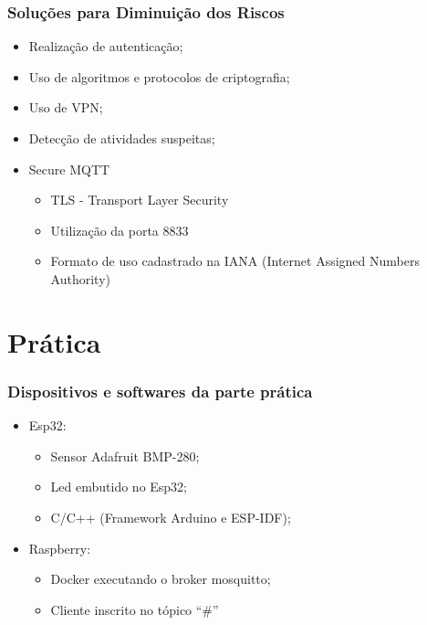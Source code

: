 \documentclass[12pt]{beamer}
\begin{document}
\begin{frame}
    \frametitle{Soluções para Diminuição dos Riscos}
    \begin{itemize}
        \item Realização de autenticação;
        \item Uso de algoritmos e protocolos de criptografia;
        \item Uso de VPN;
        \item Detecção de atividades suspeitas;
        \item Secure MQTT
                \begin{itemize}
                    \item TLS - Transport Layer Security
                    \item Utilização da porta 8833
                    \item Formato de uso cadastrado na IANA (Internet Assigned Numbers Authority)
                \end{itemize}
    \end{itemize}
\end{frame}


\section{Prática}\label{Prática}
\begin{frame}
    \frametitle{Dispositivos e softwares da parte prática}
    \begin{itemize}
        \item Esp32:
            \begin{itemize}
                \item Sensor Adafruit BMP-280;
                \item Led embutido no Esp32;
                \item C/C++ (Framework Arduino e ESP-IDF);
            \end{itemize}
        \item Raspberry:
            \begin{itemize}
                \item Docker executando o broker mosquitto;
                \item Cliente inscrito no tópico ``\#''
            \end{itemize}
    \end{itemize}
\end{frame}
\end{document}
